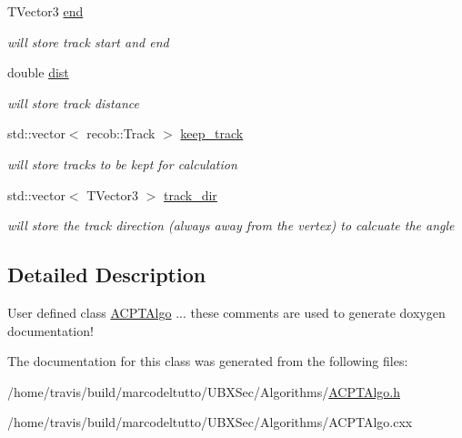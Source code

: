 \begin{DoxyCompactItemize}
\item 
\hypertarget{classubxsec_1_1ACPTAlgo_af00d6d052adec3602acb3a8eee032679}{T\-Vector3 \hyperlink{classubxsec_1_1ACPTAlgo_af00d6d052adec3602acb3a8eee032679}{end}}\label{classubxsec_1_1ACPTAlgo_af00d6d052adec3602acb3a8eee032679}

\begin{DoxyCompactList}\small\item\em will store track start and end \end{DoxyCompactList}\item 
\hypertarget{classubxsec_1_1ACPTAlgo_a99ba7b169c1dd4e7ffaf9ad943939879}{double \hyperlink{classubxsec_1_1ACPTAlgo_a99ba7b169c1dd4e7ffaf9ad943939879}{dist}}\label{classubxsec_1_1ACPTAlgo_a99ba7b169c1dd4e7ffaf9ad943939879}

\begin{DoxyCompactList}\small\item\em will store track distance \end{DoxyCompactList}\item 
\hypertarget{classubxsec_1_1ACPTAlgo_a8b260c612412c091693f6db963ae933a}{std\-::vector$<$ recob\-::\-Track $>$ \hyperlink{classubxsec_1_1ACPTAlgo_a8b260c612412c091693f6db963ae933a}{keep\-\_\-track}}\label{classubxsec_1_1ACPTAlgo_a8b260c612412c091693f6db963ae933a}

\begin{DoxyCompactList}\small\item\em will store tracks to be kept for calculation \end{DoxyCompactList}\item 
\hypertarget{classubxsec_1_1ACPTAlgo_a6e27c240684a479e01afe5713bec5bd9}{std\-::vector$<$ T\-Vector3 $>$ \hyperlink{classubxsec_1_1ACPTAlgo_a6e27c240684a479e01afe5713bec5bd9}{track\-\_\-dir}}\label{classubxsec_1_1ACPTAlgo_a6e27c240684a479e01afe5713bec5bd9}

\begin{DoxyCompactList}\small\item\em will store the track direction (always away from the vertex) to calcuate the angle \end{DoxyCompactList}\end{DoxyCompactItemize}


\subsection{Detailed Description}
User defined class \hyperlink{classubxsec_1_1ACPTAlgo}{A\-C\-P\-T\-Algo} ... these comments are used to generate doxygen documentation! 

The documentation for this class was generated from the following files\-:\begin{DoxyCompactItemize}
\item 
/home/travis/build/marcodeltutto/\-U\-B\-X\-Sec/\-Algorithms/\hyperlink{ACPTAlgo_8h}{A\-C\-P\-T\-Algo.\-h}\item 
/home/travis/build/marcodeltutto/\-U\-B\-X\-Sec/\-Algorithms/A\-C\-P\-T\-Algo.\-cxx\end{DoxyCompactItemize}
